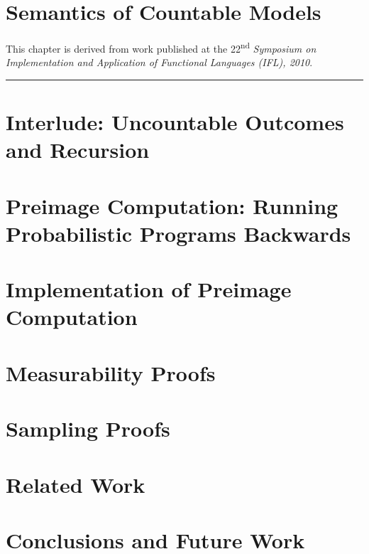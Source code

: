 \documentclass[phd,electronic,twosidetoc,letterpaper,chaptercenter,parttop,lof]{byumsphd}
\begin{document}



\chapter{Semantics of Countable Models}
\label{ch:countable-models}

This chapter is derived from work published at the 22\textsuperscript{nd} \emph{Symposium on Implementation and Application of Functional Languages (IFL), 2010}.

\vspace{\baselineskip}
\hrule
\vspace{\baselineskip}



\chapter{Interlude: Uncountable Outcomes and Recursion}
\label{ch:interlude}




\chapter{Preimage Computation: Running Probabilistic Programs Backwards}
\label{ch:preimage1}




\chapter{Implementation of Preimage Computation}
\label{ch:preimage2}




\chapter{Measurability Proofs}
\label{ch:measurability}




\chapter{Sampling Proofs}
\label{ch:sampling-algorithm-proofs}




\chapter{Related Work}




\chapter{Conclusions and Future Work}






\end{document}
